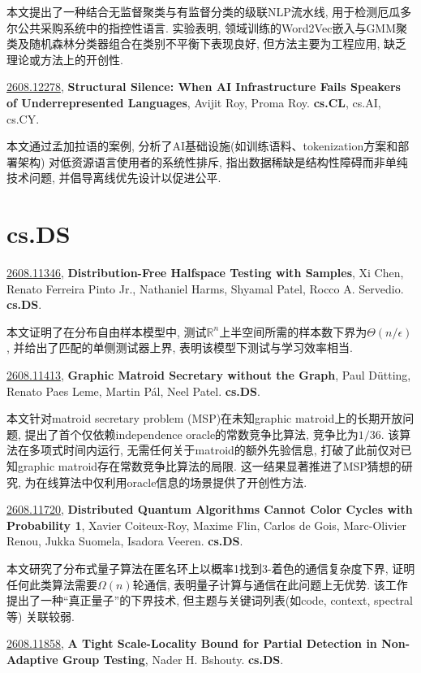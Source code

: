 \documentclass[9pt, a4paper]{article}
\theoremstyle{plain}
\theoremstyle{definition}
\theoremstyle{remark}
\newcommand{\arxivwithtarget}[3]{\hypertarget{#1}{}\href{https://arxiv.org/abs/#1}{#1}, \textbf{\textcolor{arxivblue}{#2}}, #3. }
\begin{document}
本文提出了一种结合无监督聚类与有监督分类的级联NLP流水线, 用于检测厄瓜多尔公共采购系统中的指控性语言. 实验表明, 领域训练的Word2Vec嵌入与GMM聚类及随机森林分类器组合在类别不平衡下表现良好, 但方法主要为工程应用, 缺乏理论或方法上的开创性.


\arxivwithtarget{2608.12278}{Structural Silence: When AI Infrastructure Fails Speakers of Underrepresented Languages}{Avijit Roy, Proma Roy}\textbf{cs.CL}, cs.AI, cs.CY.

本文通过孟加拉语的案例, 分析了AI基础设施(如训练语料、tokenization方案和部署架构) 对低资源语言使用者的系统性排斥, 指出数据稀缺是结构性障碍而非单纯技术问题, 并倡导离线优先设计以促进公平.


\section{cs.DS}
\arxivwithtarget{2608.11346}{Distribution-Free Halfspace Testing with Samples}{Xi Chen, Renato Ferreira Pinto Jr., Nathaniel Harms, Shyamal Patel, Rocco A. Servedio}\textbf{cs.DS}.

本文证明了在分布自由样本模型中, 测试$\mathbb{R}^n$上半空间所需的样本数下界为$\Theta(n/\epsilon)$, 并给出了匹配的单侧测试器上界, 表明该模型下测试与学习效率相当.


\arxivwithtarget{2608.11413}{Graphic Matroid Secretary without the Graph}{Paul Dütting, Renato Paes Leme, Martin Pál, Neel Patel}\textbf{cs.DS}.

本文针对matroid secretary problem (MSP)在未知graphic matroid上的长期开放问题, 提出了首个仅依赖independence oracle的常数竞争比算法, 竞争比为$1/36$. 该算法在多项式时间内运行, 无需任何关于matroid的额外先验信息, 打破了此前仅对已知graphic matroid存在常数竞争比算法的局限. 这一结果显著推进了MSP猜想的研究, 为在线算法中仅利用oracle信息的场景提供了开创性方法.


\arxivwithtarget{2608.11720}{Distributed Quantum Algorithms Cannot Color Cycles with Probability 1}{Xavier Coiteux-Roy, Maxime Flin, Carlos de Gois, Marc-Olivier Renou, Jukka Suomela, Isadora Veeren}\textbf{cs.DS}.

本文研究了分布式量子算法在匿名环上以概率1找到3-着色的通信复杂度下界, 证明任何此类算法需要$\Omega(n)$轮通信, 表明量子计算与通信在此问题上无优势. 该工作提出了一种“真正量子”的下界技术, 但主题与关键词列表(如code, context, spectral等) 关联较弱.


\arxivwithtarget{2608.11858}{A Tight Scale-Locality Bound for Partial Detection in Non-Adaptive Group Testing}{Nader H. Bshouty}\textbf{cs.DS}.
\end{document}
